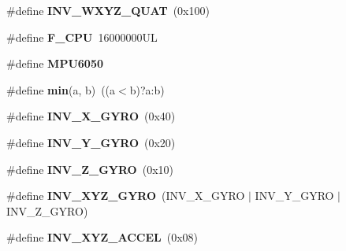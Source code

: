 \begin{DoxyCompactItemize}
\item 
\#define {\bfseries I\+N\+V\+\_\+\+W\+X\+Y\+Z\+\_\+\+Q\+U\+AT}~(0x100)\hypertarget{group___d_r_i_v_e_r_s_ga3d79cffe845a796a27d03432a1f2ade0}{}\label{group___d_r_i_v_e_r_s_ga3d79cffe845a796a27d03432a1f2ade0}

\item 
\#define {\bfseries F\+\_\+\+C\+PU}~16000000\+UL\hypertarget{group___d_r_i_v_e_r_s_ga43bafb28b29491ec7f871319b5a3b2f8}{}\label{group___d_r_i_v_e_r_s_ga43bafb28b29491ec7f871319b5a3b2f8}

\item 
\#define {\bfseries M\+P\+U6050}\hypertarget{group___d_r_i_v_e_r_s_ga6d132f914f18cb144a0eaf36312045c8}{}\label{group___d_r_i_v_e_r_s_ga6d132f914f18cb144a0eaf36312045c8}

\item 
\#define {\bfseries min}(a,  b)~((a$<$b)?a\+:b)\hypertarget{group___d_r_i_v_e_r_s_gac6afabdc09a49a433ee19d8a9486056d}{}\label{group___d_r_i_v_e_r_s_gac6afabdc09a49a433ee19d8a9486056d}

\item 
\#define {\bfseries I\+N\+V\+\_\+\+X\+\_\+\+G\+Y\+RO}~(0x40)\hypertarget{group___d_r_i_v_e_r_s_gabf02bf28541421d59f8be764f2b95407}{}\label{group___d_r_i_v_e_r_s_gabf02bf28541421d59f8be764f2b95407}

\item 
\#define {\bfseries I\+N\+V\+\_\+\+Y\+\_\+\+G\+Y\+RO}~(0x20)\hypertarget{group___d_r_i_v_e_r_s_gacdd8ff833a34dba08ca2aa145eb92b44}{}\label{group___d_r_i_v_e_r_s_gacdd8ff833a34dba08ca2aa145eb92b44}

\item 
\#define {\bfseries I\+N\+V\+\_\+\+Z\+\_\+\+G\+Y\+RO}~(0x10)\hypertarget{group___d_r_i_v_e_r_s_ga50205b5cc6089b33b2561c854eb8b0fd}{}\label{group___d_r_i_v_e_r_s_ga50205b5cc6089b33b2561c854eb8b0fd}

\item 
\#define {\bfseries I\+N\+V\+\_\+\+X\+Y\+Z\+\_\+\+G\+Y\+RO}~(I\+N\+V\+\_\+\+X\+\_\+\+G\+Y\+RO $\vert$ I\+N\+V\+\_\+\+Y\+\_\+\+G\+Y\+RO $\vert$ I\+N\+V\+\_\+\+Z\+\_\+\+G\+Y\+RO)\hypertarget{group___d_r_i_v_e_r_s_ga3fdc30f9c0a26c2c4e2bb88921f91629}{}\label{group___d_r_i_v_e_r_s_ga3fdc30f9c0a26c2c4e2bb88921f91629}

\item 
\#define {\bfseries I\+N\+V\+\_\+\+X\+Y\+Z\+\_\+\+A\+C\+C\+EL}~(0x08)\hypertarget{group___d_r_i_v_e_r_s_gaa03f025a17ed491e70b88274e89c75c5}{}\label{group___d_r_i_v_e_r_s_gaa03f025a17ed491e70b88274e89c75c5}


\end{DoxyCompactItemize}
